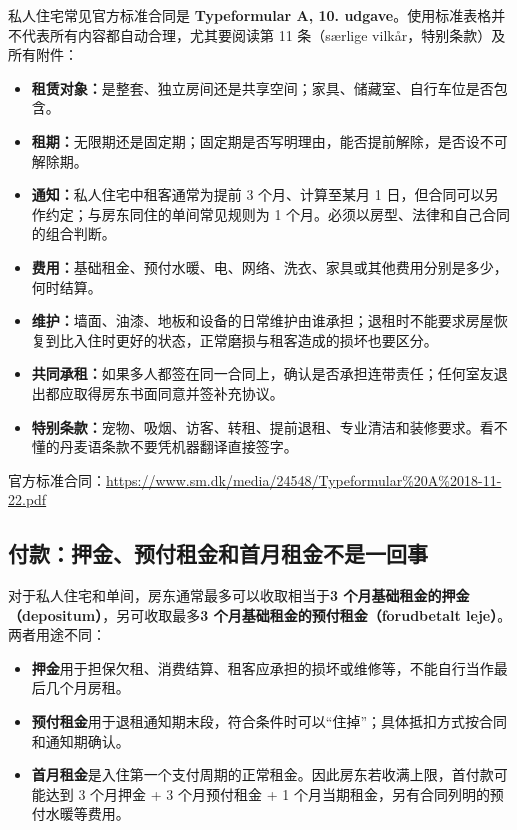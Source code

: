 私人住宅常见官方标准合同是 \textbf{Typeformular A, 10. udgave}。使用标准表格并不代表所有内容都自动合理，尤其要阅读第 11 条（særlige vilkår，特别条款）及所有附件：

\begin{itemize}[leftmargin=2em,itemsep=3pt]
  \item \textbf{租赁对象：}是整套、独立房间还是共享空间；家具、储藏室、自行车位是否包含。
  \item \textbf{租期：}无限期还是固定期；固定期是否写明理由，能否提前解除，是否设不可解除期。
  \item \textbf{通知：}私人住宅中租客通常为提前 3 个月、计算至某月 1 日，但合同可以另作约定；与房东同住的单间常见规则为 1 个月。必须以房型、法律和自己合同的组合判断。
  \item \textbf{费用：}基础租金、预付水暖、电、网络、洗衣、家具或其他费用分别是多少，何时结算。
  \item \textbf{维护：}墙面、油漆、地板和设备的日常维护由谁承担；退租时不能要求房屋恢复到比入住时更好的状态，正常磨损与租客造成的损坏也要区分。
  \item \textbf{共同承租：}如果多人都签在同一合同上，确认是否承担连带责任；任何室友退出都应取得房东书面同意并签补充协议。
  \item \textbf{特别条款：}宠物、吸烟、访客、转租、提前退租、专业清洁和装修要求。看不懂的丹麦语条款不要凭机器翻译直接签字。
\end{itemize}

官方标准合同：\url{https://www.sm.dk/media/24548/Typeformular\%20A\%2018-11-22.pdf}

\subsection{付款：押金、预付租金和首月租金不是一回事}

对于私人住宅和单间，房东通常最多可以收取相当于\textbf{3 个月基础租金的押金（depositum）}，另可收取最多\textbf{3 个月基础租金的预付租金（forudbetalt leje）}。两者用途不同：

\begin{itemize}[leftmargin=2em,itemsep=3pt]
  \item \textbf{押金}用于担保欠租、消费结算、租客应承担的损坏或维修等，不能自行当作最后几个月房租。
  \item \textbf{预付租金}用于退租通知期末段，符合条件时可以“住掉”；具体抵扣方式按合同和通知期确认。
  \item \textbf{首月租金}是入住第一个支付周期的正常租金。因此房东若收满上限，首付款可能达到 3 个月押金 + 3 个月预付租金 + 1 个月当期租金，另有合同列明的预付水暖等费用。
\end{itemize}

